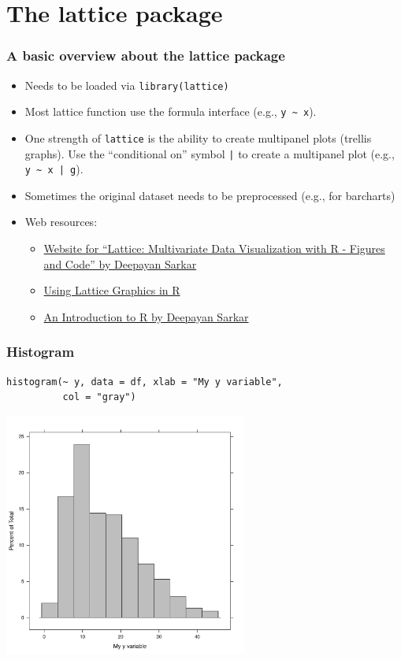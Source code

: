 \documentclass[bigger]{beamer}
\begin{document}
\section{The lattice package}
\label{sec-2}
\begin{frame}[shrink = 10]
\frametitle{A basic overview about the lattice package}
\label{sec-2_1}


\begin{itemize}
\item Needs to be loaded via \texttt{library(lattice)}
\item Most lattice function use the formula interface (e.g., \texttt{y \textasciitilde{} x}).
\item One strength of \texttt{lattice} is the ability to create multipanel plots (trellis graphs). Use the
  ``conditional on'' symbol \texttt{|} to create a multipanel plot (e.g., \texttt{y \textasciitilde{} x | g}).
\item Sometimes the original dataset needs to be preprocessed (e.g., for barcharts)
\item Web resources:

\begin{itemize}
\item \href{http://lmdvr.r-forge.r-project.org/figures/figures.html}{Website for ``Lattice: Multivariate Data Visualization with R - Figures and Code'' by Deepayan Sarkar}
\item \href{http://www.cet.sunderland.ac.uk/~cs0her/Statistics/UsingLatticeGraphicsInR.htm}{Using Lattice Graphics in R}
\item \href{http://www.isid.ac.in/~deepayan/R-tutorials/labs/04_lattice_lab.pdf}{An Introduction to R by Deepayan Sarkar}
\end{itemize}

\end{itemize}
\end{frame}
\begin{frame}[fragile]
\frametitle{Histogram}
\label{sec-2_2}


\lstset{language=R}
\begin{lstlisting}
histogram(~ y, data = df, xlab = "My y variable", 
          col = "gray")
\end{lstlisting}



\includegraphics[width=0.6\textwidth]{../graphs/lattice_hist.pdf}
\end{frame}
\end{document}

